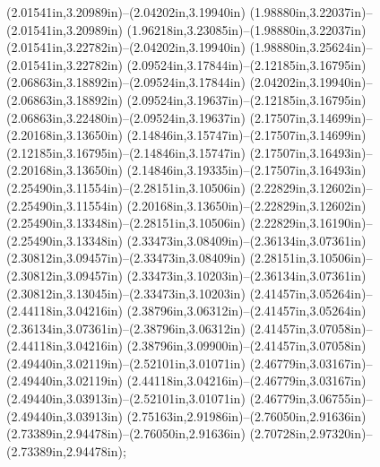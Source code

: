 (2.01541in,3.20989in)--(2.04202in,3.19940in) (1.98880in,3.22037in)--(2.01541in,3.20989in) (1.96218in,3.23085in)--(1.98880in,3.22037in) (2.01541in,3.22782in)--(2.04202in,3.19940in) (1.98880in,3.25624in)--(2.01541in,3.22782in) (2.09524in,3.17844in)--(2.12185in,3.16795in) (2.06863in,3.18892in)--(2.09524in,3.17844in) (2.04202in,3.19940in)--(2.06863in,3.18892in) (2.09524in,3.19637in)--(2.12185in,3.16795in) (2.06863in,3.22480in)--(2.09524in,3.19637in) (2.17507in,3.14699in)--(2.20168in,3.13650in) (2.14846in,3.15747in)--(2.17507in,3.14699in) (2.12185in,3.16795in)--(2.14846in,3.15747in) (2.17507in,3.16493in)--(2.20168in,3.13650in) (2.14846in,3.19335in)--(2.17507in,3.16493in) (2.25490in,3.11554in)--(2.28151in,3.10506in) (2.22829in,3.12602in)--(2.25490in,3.11554in) (2.20168in,3.13650in)--(2.22829in,3.12602in) (2.25490in,3.13348in)--(2.28151in,3.10506in) (2.22829in,3.16190in)--(2.25490in,3.13348in) (2.33473in,3.08409in)--(2.36134in,3.07361in) (2.30812in,3.09457in)--(2.33473in,3.08409in) (2.28151in,3.10506in)--(2.30812in,3.09457in) (2.33473in,3.10203in)--(2.36134in,3.07361in) (2.30812in,3.13045in)--(2.33473in,3.10203in) (2.41457in,3.05264in)--(2.44118in,3.04216in) (2.38796in,3.06312in)--(2.41457in,3.05264in) (2.36134in,3.07361in)--(2.38796in,3.06312in) (2.41457in,3.07058in)--(2.44118in,3.04216in) (2.38796in,3.09900in)--(2.41457in,3.07058in) (2.49440in,3.02119in)--(2.52101in,3.01071in) (2.46779in,3.03167in)--(2.49440in,3.02119in) (2.44118in,3.04216in)--(2.46779in,3.03167in) (2.49440in,3.03913in)--(2.52101in,3.01071in) (2.46779in,3.06755in)--(2.49440in,3.03913in) (2.75163in,2.91986in)--(2.76050in,2.91636in) (2.73389in,2.94478in)--(2.76050in,2.91636in) (2.70728in,2.97320in)--(2.73389in,2.94478in);
